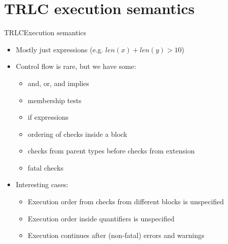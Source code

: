 \documentclass[aspectratio=169]{beamer}
\begin{document}
\section{TRLC execution semantics}

\begin{frame}{TRLC}{Execution semantics}
  \begin{itemize}
  \item Mostly just expressions (e.g. $len(x) + len(y) > 10$)
  \item Control flow is rare, but we have some:
    \begin{itemize}
    \item and, or, and implies
    \item membership tests
    \item if expressions
    \item ordering of checks inside a block
    \item checks from parent types before checks from extension
    \item fatal checks
    \end{itemize}
  \item Interesting cases:
    \begin{itemize}
    \item Execution order from checks from different blocks is unspecified
    \item Execution order inside quantifiers is unspecified
    \item Execution continues after (non-fatal) errors and warnings
    \end{itemize}
  \end{itemize}
\end{frame}
\end{document}
